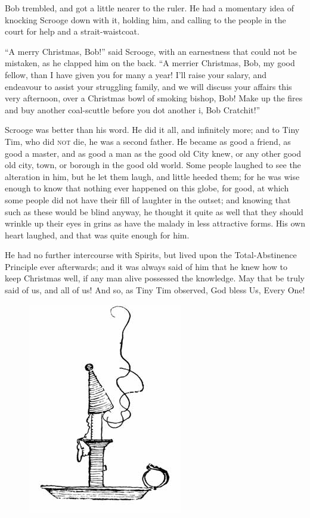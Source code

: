 \documentclass[paper=5.5in:8.5in,BCOR=5mm,twoside,DIV=calc,12pt,usegeometry]{scrbook} %
\begin{document}
Bob trembled, and got a little nearer to the ruler. He had a momentary idea of knocking Scrooge down with it, holding him, and calling to the people in the court for help and a strait-waistcoat.

\enquote{A merry Christmas, Bob!} said Scrooge, with an earnestness that could not be mistaken, as he clapped him on the back. \enquote{A merrier Christmas, Bob, my good fellow, than I have given you for many a year! I'll raise your salary, and endeavour to assist your struggling family, and we will discuss your affairs this very afternoon, over a Christmas bowl of smoking bishop, Bob! Make up the fires and buy another coal-scuttle before you dot another i, Bob Cratchit!}

Scrooge was better than his word. He did it all, and infinitely more; and to Tiny Tim, who did \textsc{not} die, he was a second father. He became as good a friend, as good a master, and as good a man as the good old City knew, or any other good old city, town, or borough in the good old world. Some people laughed to see the alteration in him, but he let them laugh, and little heeded them; for he was wise enough to know that nothing ever happened on this globe, for good, at which some people did not have their fill of laughter in the outset; and knowing that such as these would be blind anyway, he thought it quite as well that they should wrinkle up their eyes in grins as have the malady in less attractive forms. His own heart laughed, and that was quite enough for him.

He had no further intercourse with Spirits, but lived upon the Total-Abstinence Principle ever afterwards; and it was always said of him that he knew how to keep Christmas well, if any man alive possessed the knowledge. May that be truly said of us, and all of us! And so, as Tiny Tim observed, God bless Us, Every One!

\begin{figure}[tbh]
\centering
\includegraphics[width=.5\linewidth]{gs182}
\end{figure}
\end{document}
